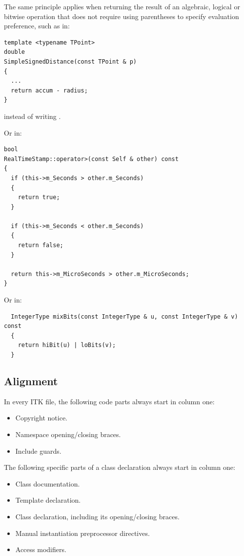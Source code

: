 The same principle applies when returning the result of an algebraic, logical or
bitwise operation that does not require using parentheses to specify
evaluation preference, such as in:

\small
\begin{verbatim}
template <typename TPoint>
double
SimpleSignedDistance(const TPoint & p)
{
  ...
  return accum - radius;
}
\end{verbatim}
\normalsize

instead of writing .

Or in:

\small
\begin{verbatim}
bool
RealTimeStamp::operator>(const Self & other) const
{
  if (this->m_Seconds > other.m_Seconds)
  {
    return true;
  }

  if (this->m_Seconds < other.m_Seconds)
  {
    return false;
  }

  return this->m_MicroSeconds > other.m_MicroSeconds;
}
\end{verbatim}
\normalsize

Or in:

\small
\begin{verbatim}
  IntegerType mixBits(const IntegerType & u, const IntegerType & v) const
  {
    return hiBit(u) | loBits(v);
  }
\end{verbatim}
\normalsize


\subsection{Alignment}%
\label{subsec:Alignment}

In every ITK file, the following code parts always start in column one:
\begin{itemize}
\item Copyright notice.
\item Namespace opening/closing braces.
\item Include guards.
\end{itemize}

The following specific parts of a class declaration always start in column one:
\begin{itemize}
\item Class documentation.
\item Template declaration.
\item Class declaration, including its opening/closing braces.
\item Manual instantiation preprocessor directives.
\item Access modifiers.
\end{itemize}

